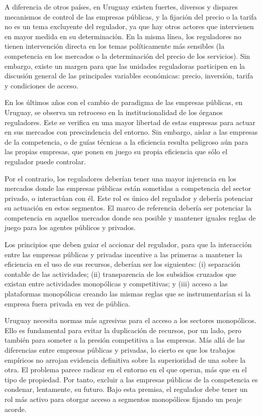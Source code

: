 \documentclass[
  12pt,
  spanish,
]{book}
\begin{document}
A diferencia de otros países, en Uruguay existen fuertes, diversos y
dispares mecanismos de control de las empresas públicas, y la fijación
del precio o la tarifa no es un tema excluyente del regulador, ya que
hay otros actores que intervienen en mayor medida en su determinación.
En la misma línea, los reguladores no tienen intervención directa en los
temas políticamente más sensibles (la competencia en los mercados o la
determinación del precio de los servicios). Sin embargo, existe un
margen para que las unidades reguladoras participen en la discusión
general de las principales variables económicas: precio, inversión,
tarifa y condiciones de acceso.

En los últimos años con el cambio de paradigma de las empresas públicas,
en Uruguay, se observa un retroceso en la institucionalidad de los
órganos reguladores. Este se verifica en una mayor libertad de estas
empresas para actuar en sus mercados con prescindencia del entorno. Sin
embargo, aislar a las empresas de la competencia, o de guías técnicas a
la eficiencia resulta peligroso aún para las propias empresas, que ponen
en juego su propia eficiencia que sólo el regulador puede controlar.

Por el contrario, los reguladores deberían tener una mayor injerencia en
los mercados donde las empresas públicas están sometidas a competencia
del sector privado, o interactúan con él. Este rol es único del
regulador y debería potenciar su actuación en estos segmentos. El marco
de referencia debería ser potenciar la competencia en aquellos mercados
donde sea posible y mantener iguales reglas de juego para los agentes
públicos y privados.

Los principios que deben guiar el accionar del regulador, para que la
interacción entre las empresas públicas y privadas incentive a las
primeras a mantener la eficiencia en el uso de sus recursos, deberían
ser los siguientes: (i) separación contable de las actividades; (ii)
transparencia de los subsidios cruzados que existan entre actividades
monopólicas y competitivas; y (iii) acceso a las plataformas monopólicas
creando las mismas reglas que se instrumentarían si la empresa fuera
privada en vez de pública.

Uruguay necesita normas más agresivas para el acceso a los sectores
monopólicos. Ello es fundamental para evitar la duplicación de recursos,
por un lado, pero también para someter a la presión competitiva a las
empresas. Más allá de las diferencias entre empresas públicas y
privadas, lo cierto es que los trabajos empíricos no arrojan evidencia
definitiva sobre la superioridad de una sobre la otra. El problema
parece radicar en el entorno en el que operan, más que en el tipo de
propiedad. Por tanto, excluir a las empresas públicas de la competencia
es condenar, lentamente, su futuro. Bajo esta premisa, el regulador debe
tener un rol más activo para otorgar acceso a segmentos monopólicos
fijando un peaje acorde.
\end{document}
